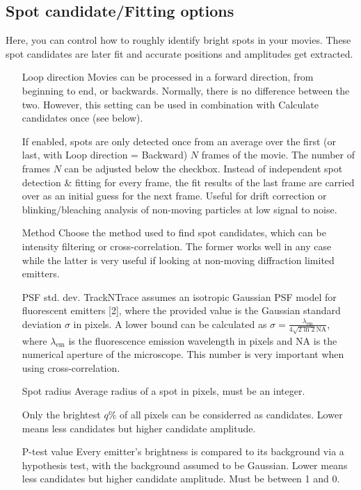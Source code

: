 \documentclass[11pt,onside]{report}
\makeatletter
\numberwithin{equation}{chapter}
\gdef\tshortstack{\@ifnextchar[\@tshortstack{\@tshortstack[c]}}
\gdef\@tshortstack[#1]{%
  \leavevmode
  \vtop\bgroup
    \baselineskip-\p@\lineskip 3\p@
    \let\mb@l\hss\let\mb@r\hss
    \expandafter\let\csname mb@#1\endcsname\relax
    \let\\\@stackcr
    \@ishortstack}
\makeatother
\begin{document}
\subsection*{Spot candidate/Fitting options}
Here, you can control how to roughly identify bright spots in your movies. These spot candidates are later fit and accurate positions and amplitudes get extracted. 
\begin{itemize}[leftmargin=2cm]
\item[Loop direction] Movies can be processed in a forward direction, from beginning to end, or backwards. Normally, there is no difference between the two. However, this setting can be used in combination with \textsf{Calculate candidates once} (see below).
\item[\smash{\tshortstack[1]{Calculate candi-\\dates once}}] If enabled, spots are only detected once from an average over the first (or last, with \textsf{Loop direction = Backward}) $N$ frames of the movie. The number of frames $N$ can be adjusted below the checkbox. Instead of independent spot detection \& fitting for every frame, the fit results of the last frame are carried over as an initial guess for the next frame. Useful for drift correction or blinking/bleaching analysis of non-moving particles at low signal to noise.
\item[Method] Choose the method used to find spot candidates, which can be intensity filtering or cross-correlation. The former works well in any case while the latter is very useful if looking at non-moving diffraction limited emitters.
\item[PSF std. dev.] TrackNTrace assumes an isotropic Gaussian PSF model for fluorescent emitters [2], where the provided value is the Gaussian standard deviation $\sigma$ in pixels. A lower bound can be calculated as $\sigma = \frac{\lambda_\mathrm{em}}{4\sqrt{2\ln 2} \mathrm{NA}}$, where $\lambda_\mathrm{em}$ is the fluorescence emission wavelength in pixels and NA is the numerical aperture of the microscope. This number is very important when using cross-correlation.
\item[Spot radius] Average radius of a spot in pixels, must be an integer.
\item[\smash{\tshortstack[1]{Percent brightest\\ pixels}}] Only the brightest $q\%$ of all pixels can be considerred as candidates. Lower means less candidates but higher candidate amplitude.
\item[P-test value] Every emitter's brightness is compared to its background via a hypothesis test, with the background assumed to be Gaussian. Lower means less candidates but higher candidate amplitude. Must be between 1 and 0.

\end{itemize}
\end{document}
